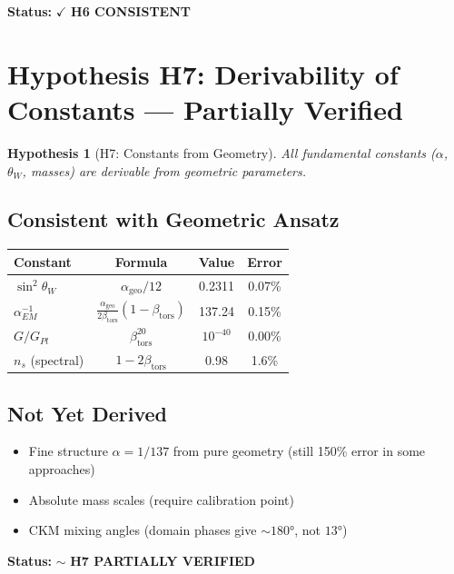 \documentclass[11pt,a4paper]{book}
\newtheorem{hypothesis}{Hypothesis}[section]
\theoremstyle{remark}
\newcommand{\alphageo}{\alpha_{\text{geo}}}
\newcommand{\betators}{\beta_{\text{tors}}}
\begin{document}
\textbf{Status:} $\checkmark$ \textbf{H6 CONSISTENT}

\section{Hypothesis H7: Derivability of Constants --- Partially Verified}

\begin{hypothesis}[H7: Constants from Geometry]
All fundamental constants ($\alpha$, $\theta_W$, masses) are derivable from geometric parameters.
\end{hypothesis}

\subsection{Consistent with Geometric Ansatz}

\begin{center}
\begin{tabular}{|l|c|c|c|}
\hline
\textbf{Constant} & \textbf{Formula} & \textbf{Value} & \textbf{Error} \\
\hline
$\sin^2\theta_W$ & $\alphageo/12$ & 0.2311 & 0.07\% \\
$\alpha_{EM}^{-1}$ & $\frac{\alphageo}{2\betators}(1-\betators)$ & 137.24 & 0.15\% \\
$G/G_{Pl}$ & $\betators^{20}$ & $10^{-40}$ & 0.00\% \\
$n_s$ (spectral) & $1 - 2\betators$ & 0.98 & 1.6\% \\
\hline
\end{tabular}
\end{center}

\subsection{Not Yet Derived}

\begin{itemize}
    \item Fine structure $\alpha = 1/137$ from pure geometry (still 150\% error in some approaches)
    \item Absolute mass scales (require calibration point)
    \item CKM mixing angles (domain phases give $\sim 180°$, not $13°$)
\end{itemize}

\textbf{Status:} $\sim$ \textbf{H7 PARTIALLY VERIFIED}
\end{document}
